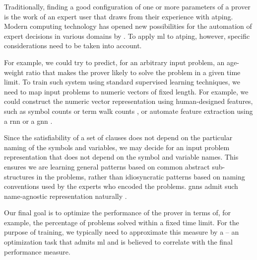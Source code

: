 Traditionally, finding a good configuration of one or more parameters of a prover is the work of an expert user that draws from their experience with \gls{atping}.
Modern computing technology has opened new possibilities for the automation of expert decisions in various domains by  \cite{DBLP:books/lib/HastieTF09,DBLP:journals/nn/Schmidhuber15}.
To apply \gls{ml} to \gls{atping}, however, specific considerations need to be taken into account.


For example, we could try to predict, for an arbitrary input problem, an age-weight ratio
that makes the prover likely to solve the problem in a given time limit.
To train such system using standard supervised learning techniques,
we need to map input problems to numeric vectors of fixed length.
For example, we could construct the numeric vector representation using human-designed features,
such as symbol counts or term walk counts \cite{DBLP:conf/mkm/JakubuvU17},
or automate feature extraction using a \gls{rnn} \cite{DBLP:conf/cade/ChvalovskyJ0U19,DBLP:conf/iclr/EvansSAKG18} or a \gls{gnn} \cite{DBLP:conf/cade/JakubuvCOP0U20}.

Since the satisfiability of a set of clauses does not depend on the particular naming of the symbols and variables,
we may decide for an input problem representation that does not depend on the symbol and variable names.
This ensures we are learning general patterns based on common abstract sub-structures in the problems,
rather than idiosyncratic patterns based on naming conventions used by the experts who encoded the problems.
\Glspl{gnn} admit such name-agnostic representation naturally \cite{DBLP:conf/cade/JakubuvCOP0U20}.

Our final goal is to optimize the performance of the prover in terms of, for example, the percentage of problems solved within a fixed time limit.
For the purpose of training,
we typically need to approximate this measure by a  -- an optimization task that admits \gls{ml} and is believed to correlate with the final performance measure.


